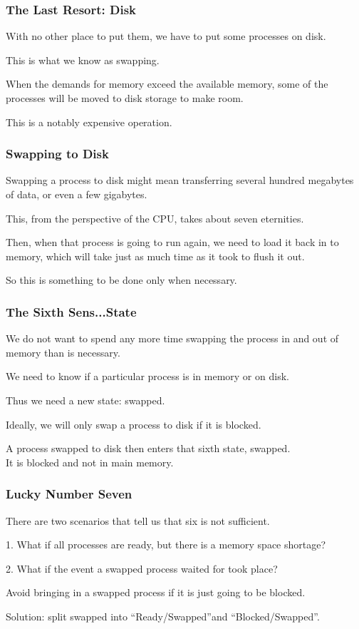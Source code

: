 \begin{frame}
\frametitle{The Last Resort: Disk}

With no other place to put them, we have to put some processes on disk.

This is what we know as \alert{swapping}.

When the demands for memory exceed the available memory, some of the processes will be moved to disk storage to make room. 

This is a notably expensive operation.
\end{frame}

\begin{frame}
\frametitle{Swapping to Disk}

Swapping a process to disk might mean transferring several hundred megabytes of data, or even a few gigabytes. 

This, from the perspective of the CPU, takes about seven eternities. 

Then, when that process is going to run again, we need to load it back in to memory, which will take just as much time as it took to flush it out. 

So this is something to be done only when necessary.

\end{frame}

\begin{frame}
\frametitle{The Sixth Sens...State}

We do not want to spend any more time swapping the process in and out of memory than is necessary.

 We need to know if a particular process is in memory or on disk.
 
Thus we need a new state: swapped.  

Ideally, we will only swap a process to disk if it is blocked. 

A process swapped to disk then enters that sixth state, swapped.\\
\quad It is blocked and not in main memory.

\end{frame}

\begin{frame}
\frametitle{Lucky Number Seven}

There are two scenarios that tell us that six is not sufficient.

1. What if all processes are ready, but there is a memory space shortage?

2. What if the event a swapped process waited for took place?

Avoid bringing in a swapped process if it is just going to be blocked.

Solution: split swapped into ``Ready/Swapped''and ``Blocked/Swapped''.

\end{frame}

